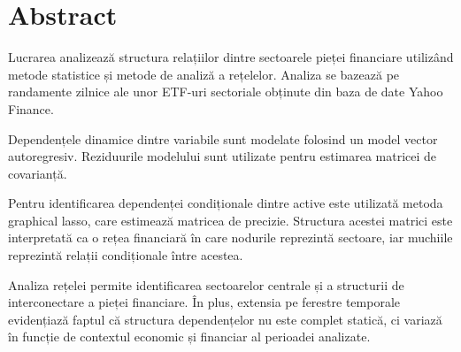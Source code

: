 \chapter*{Abstract}

Lucrarea analizează structura relațiilor dintre sectoarele pieței financiare utilizând metode statistice și metode de analiză a rețelelor. Analiza se bazează pe randamente zilnice ale unor ETF-uri sectoriale obținute din baza de date Yahoo Finance.

Dependențele dinamice dintre variabile sunt modelate folosind un model vector autoregresiv. Reziduurile modelului sunt utilizate pentru estimarea matricei de covarianță.

Pentru identificarea dependenței condiționale dintre active este utilizată metoda graphical lasso, care estimează matricea de precizie. Structura acestei matrici este interpretată ca o rețea financiară în care nodurile reprezintă sectoare, iar muchiile reprezintă relații condiționale între acestea.

Analiza rețelei permite identificarea sectoarelor centrale și a structurii de interconectare a pieței financiare. În plus, extensia pe ferestre temporale evidențiază faptul că structura dependențelor nu este complet statică, ci variază în funcție de contextul economic și financiar al perioadei analizate.